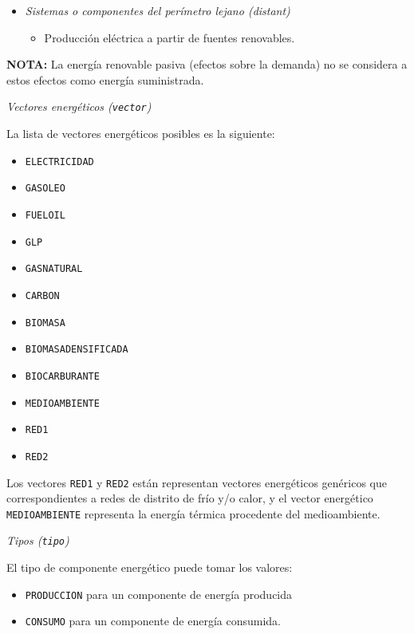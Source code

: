 \documentclass[10pt,notitlepage,oneside,a4paper]{article}
\begin{document}
\begin{myquote}
\begin{itemize}
\item \textit{Sistemas o componentes del perímetro \textit{lejano} (distant)}

\begin{itemize}
\item Producción eléctrica a partir de fuentes renovables.
\end{itemize}
\end{itemize}

\textbf{NOTA:} La energía renovable pasiva (efectos sobre la demanda) no se considera a estos efectos como energía suministrada.
\end{myquote}

\textit{Vectores energéticos (\texttt{vector})}

La lista de vectores energéticos posibles es la siguiente:

\begin{multicols}{3}
\begin{itemize}
\item \texttt{ELECTRICIDAD}
\item \texttt{GASOLEO}
\item \texttt{FUELOIL}
\item \texttt{GLP}
\item \texttt{GASNATURAL}
\item \texttt{CARBON}
\item \texttt{BIOMASA}
\item \texttt{BIOMASADENSIFICADA}
\item \texttt{BIOCARBURANTE}
\item \texttt{MEDIOAMBIENTE}
\item \texttt{RED1}
\item \texttt{RED2}
\end{itemize}
\end{multicols}

Los vectores \texttt{RED1} y \texttt{RED2} están representan vectores energéticos genéricos que correspondientes a redes de distrito de frío y/o calor, y el vector energético \texttt{MEDIOAMBIENTE} representa la energía térmica procedente del medioambiente.

\textit{Tipos (\texttt{tipo})}

El tipo de componente energético puede tomar los valores:

\begin{itemize}
\item \texttt{PRODUCCION} para un componente de energía producida
\item \texttt{CONSUMO} para un componente de energía consumida.
\end{itemize}
\end{document}
